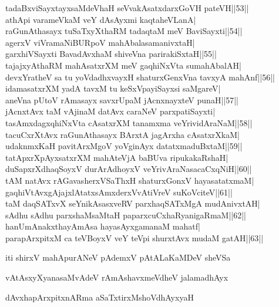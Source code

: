 \documentclass{article}
\begin{document}
tadaBxviSayxtayxsaMdeVhaH seVvakAsatxdarxGoVH pateVH||53||\\
athApi varameVkaM veY dAsAyxmi kaqtaheVLanA|\\
raGunAthasayx tuSaTxyXthaRM tadaqtaM meV BaviSayxti||54||\\
agerxV viVramaNiBURpoV mahAbalasamanivxtaH|\\
garxhiVSayxti BavadAvxhaM shiveVna parirakiSxtaH||55||\\
tajajxyAthaRM mahAsatxrXM meV gaqhiNxVta sumahAbalAH|\\
devxYratheV sa tu yoVdadhxvayxH shaturxGenxVna tavxyA mahAnf||56||\\
idamasatxrXM yadA tavxM tu keSxVpayiSayxsi saMgareV|\\
aneVna pUtoV rAmasayx savxrUpaM jAcnxnayxteV punaH||57||\\
jAcnxtAvx taM vAjinaM datAvx caraNeV parxpatiSayxti|\\
tasAmxdagxqhiNxVta cAsatxrXM tanamxma veYrividAraNaM||58||\\
tacuCxrXtAvx raGunAthasayx BArxtA jagArxha cAsatxrXkaM|\\
udaknmxKaH pavitArxMgoV yoVginAyx datatxmaduBxtaM||59||\\
tatApxrXpAyxsatxrXM mahAteVjA baBUva ripukakaRshaH|\\
duSapxrXdhaqSoyxV durArAdhoyxV veYrivAraNasacaCxqNiH||60||\\
tAM natAvx rAGavasherxVSaThxH shaturxGonxV hayasatatxmaM|\\
gaqhiVtAvxgAjajxlAtatxsAmxderxVvAtiVreV suKoVciteV||61||\\
taM daqSATxvX seYnikAsasxveRV parxhaqSATxMgA mudAnivxtAH|\\
sAdhu sAdhu parxshaMsaMtaH paparxcuCxhaRyanigaRmaM||62||\\
hanUmAnakxthayAmAsa hayasAyxgamanaM mahatf|\\
parapArxpitxM ca teVBoyxV veY teVpi shurxtAvx mudaM gatAH||63||

\begin{center}
iti shirxV mahApurANeV pAdemxV pAtALaKaMDeV sheVSa
\end{center}

\begin{center}
vAtAsxyXyanasaMvAdeV rAmAshavxmeVdheV jalamadhAyx
\end{center}

\begin{center}
dAvxhapArxpitxnARma aSaTxtirxMshoVdhAyxyaH
\end{center}
\end{document}
